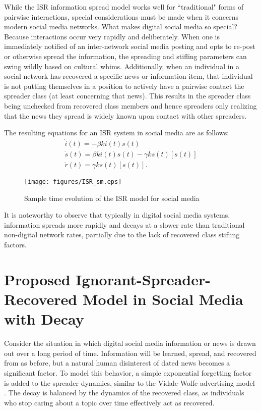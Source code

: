 While the ISR information spread model works well for ``traditional" forms of pairwise interactions, special considerations must be made when it concerns modern social media networks. What makes digital social media so special? Because interactions occur very rapidly and deliberately. When one is immediately notified of an inter-network social media posting and opts to re-post or otherwise spread the information, the spreading and stifling parameters can swing wildly based on cultural whims. Additionally, when an individual in a social network has recovered a specific news or information item, that individual is not putting themselves in a position to actively have a pairwise contact the spreader class (at least concerning that news). This results in the spreader class being unchecked from recovered class members and hence spreaders only realizing that the news they spread is widely known upon contact with other spreaders. 

\noindent The resulting equations for an ISR system in social media are as follows:
\begin{equation}\label{eqn:ISR_dynamics_sm}
\left.\begin{aligned}
\dot{i}(t) = -\beta k i(t)s(t)\\
\dot{s}(t) = \beta k i(t)s(t) - \gamma k s(t)[s(t)]\\
\dot{r}(t) = \gamma k s(t)[s(t)].
\end{aligned}\right.
\end{equation}

\begin{figure}[!htbp] \centering
  \texttt{[image: figures/ISR\_sm.eps]}
  \caption{Sample time evolution of the ISR model for social media}
  \label{fig:ISR_sm}
\end{figure}

\noindent It is noteworthy to observe that typically in digital social media systems, information spreads more rapidly and decays at a slower rate than traditional non-digital network rates, partially due to the lack of recovered class stifling factors.

\section{Proposed Ignorant-Spreader-Recovered Model in Social Media with Decay}

Consider the situation in which digital social media information or news is drawn out over a long period of time. Information will be learned, spread, and recovered from as before, but a natural human disinterest of dated news becomes a significant factor. To model this behavior, a simple exponential forgetting factor is added to the spreader dynamics, similar to the Vidale-Wolfe advertising model \cite{vidale1957operations}. The decay is balanced by the dynamics of the recovered class, as individuals who stop caring about a topic over time effectively act as recovered.

